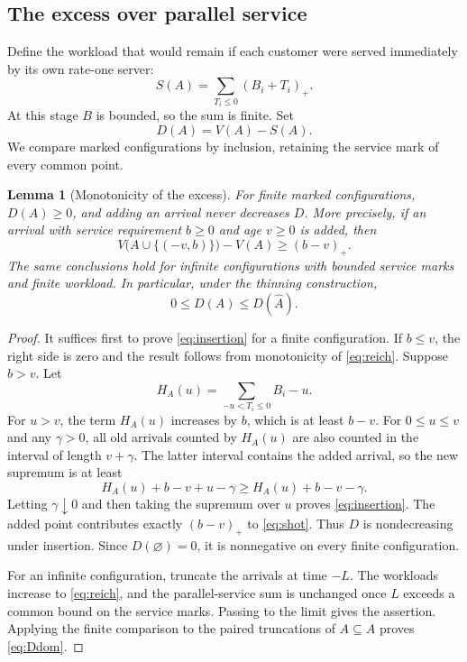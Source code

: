 \documentclass[10pt,a4paper]{amsart}
\numberwithin{equation}{section}
\newtheorem{lemma}[theorem]{Lemma}
\newcommand{\1}{\mathbf 1}
\begin{document}
\subsection{The excess over parallel service}
Define the workload that would remain if each customer were served immediately by its own rate-one server:
\begin{equation}\label{eq:shot}
 S(A)=\sum_{T_i\le0}(B_i+T_i)_+.
\end{equation}
At this stage $B$ is bounded, so the sum is finite. Set
\begin{equation}\label{eq:D}
 D(A)=V(A)-S(A).
\end{equation}
We compare marked configurations by inclusion, retaining the service mark of every common point.

\begin{lemma}[Monotonicity of the excess]\label{lem:excess}
For finite marked configurations, $D(A)\ge0$, and adding an arrival never decreases $D$. More precisely, if an arrival with service requirement $b\ge0$ and age $v\ge0$ is added, then
\begin{equation}\label{eq:insertion}
 V\bigl(A\cup\{(-v,b)\}\bigr)-V(A)\ge(b-v)_+.
\end{equation}
The same conclusions hold for infinite configurations with bounded service marks and finite workload. In particular, under the thinning construction,
\begin{equation}\label{eq:Ddom}
 0\le D(A)\le D(\widehat A).
\end{equation}
\end{lemma}
\begin{proof}
It suffices first to prove \eqref{eq:insertion} for a finite configuration. If $b\le v$, the right side is zero and the result follows from monotonicity of \eqref{eq:reich}. Suppose $b>v$. Let
\[
 H_A(u)=\sum_{-u<T_i\le0}B_i-u.
\]
For $u>v$, the term $H_A(u)$ increases by $b$, which is at least $b-v$. For $0\le u\le v$ and any $\gamma>0$, all old arrivals counted by $H_A(u)$ are also counted in the interval of length $v+\gamma$. The latter interval contains the added arrival, so the new supremum is at least
\[
 H_A(u)+b-v+u-\gamma\ge H_A(u)+b-v-\gamma.
\]
Letting $\gamma\downarrow0$ and then taking the supremum over $u$ proves \eqref{eq:insertion}. The added point contributes exactly $(b-v)_+$ to \eqref{eq:shot}. Thus $D$ is nondecreasing under insertion. Since $D(\varnothing)=0$, it is nonnegative on every finite configuration.

For an infinite configuration, truncate the arrivals at time $-L$. The workloads increase to \eqref{eq:reich}, and the parallel-service sum is unchanged once $L$ exceeds a common bound on the service marks. Passing to the limit gives the assertion. Applying the finite comparison to the paired truncations of $A\subseteq\widehat A$ proves \eqref{eq:Ddom}.
\end{proof}
\end{document}
